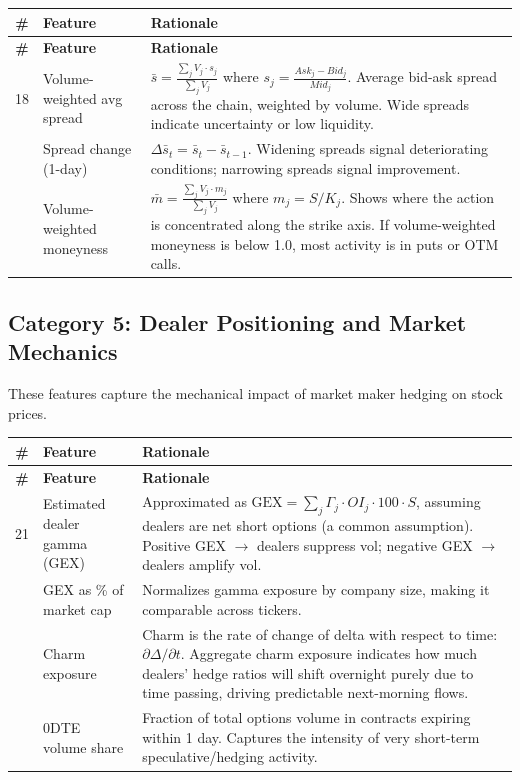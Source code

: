 \documentclass[11pt,a4paper]{article}
\begin{document}
\begin{longtable}{@{}cp{3cm}p{8cm}@{}}
\toprule
\textbf{\#} & \textbf{Feature} & \textbf{Rationale} \\
\midrule
\endfirsthead
\toprule
\textbf{\#} & \textbf{Feature} & \textbf{Rationale} \\
\midrule
\endhead
18 & Volume-weighted avg spread & $\bar{s} = \frac{\sum_j V_j \cdot s_j}{\sum_j V_j}$ where $s_j = \frac{Ask_j - Bid_j}{Mid_j}$. Average bid-ask spread across the chain, weighted by volume. Wide spreads indicate uncertainty or low liquidity. \\
\addlinespace
19 & Spread change (1-day) & $\Delta \bar{s}_t = \bar{s}_t - \bar{s}_{t-1}$. Widening spreads signal deteriorating conditions; narrowing spreads signal improvement. \\
\addlinespace
20 & Volume-weighted moneyness & $\bar{m} = \frac{\sum_j V_j \cdot m_j}{\sum_j V_j}$ where $m_j = S/K_j$. Shows where the action is concentrated along the strike axis. If volume-weighted moneyness is below 1.0, most activity is in puts or OTM calls. \\
\bottomrule
\end{longtable}

\subsection{Category 5: Dealer Positioning and Market Mechanics}

These features capture the mechanical impact of market maker hedging on stock prices.

\begin{longtable}{@{}cp{3cm}p{8cm}@{}}
\toprule
\textbf{\#} & \textbf{Feature} & \textbf{Rationale} \\
\midrule
\endfirsthead
\toprule
\textbf{\#} & \textbf{Feature} & \textbf{Rationale} \\
\midrule
\endhead
21 & Estimated dealer gamma (GEX) & Approximated as $\text{GEX} = \sum_j \Gamma_j \cdot OI_j \cdot 100 \cdot S$, assuming dealers are net short options (a common assumption). Positive GEX $\rightarrow$ dealers suppress vol; negative GEX $\rightarrow$ dealers amplify vol. \\
\addlinespace
22 & GEX as \% of market cap & Normalizes gamma exposure by company size, making it comparable across tickers. \\
\addlinespace
23 & Charm exposure & Charm is the rate of change of delta with respect to time: $\partial \Delta / \partial t$. Aggregate charm exposure indicates how much dealers' hedge ratios will shift overnight purely due to time passing, driving predictable next-morning flows. \\
\addlinespace
24 & 0DTE volume share & Fraction of total options volume in contracts expiring within 1 day. Captures the intensity of very short-term speculative/hedging activity. \\
\bottomrule
\end{longtable}
\end{document}
